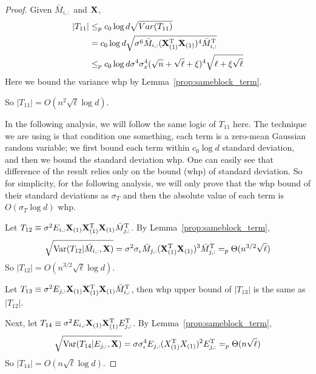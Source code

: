 \begin{proof}
Given $\bar M_{i,:}$ and $\mathbf{X}$, 
\begin{equation}
\begin{split}
    \left|T_{11}\right|  
    &\leq_p c_0 \log d \sqrt{Var(T_{11})}    \\ 
    &= c_0 \log d  \sqrt{\sigma^6 \bar M_{i, :}(\mathbf{X}_{(1)}^{\mathrm{T}}\mathbf{X}_{(1)})^4\bar M^{\mathrm{T}}_{i, :}}    \\ 
    &\leq_p c_0 \log d  \sigma^4 \sigma^4_x (\sqrt n + \sqrt \ell + \xi)^{4}\sqrt{\ell + \xi \sqrt{\ell}} 
\end{split}
\end{equation}
Here we bound the variance whp by Lemma~\ref{prop:sameblock_term}.

So $|T_{11}| = O(n^2\sqrt{\ell}\log d)$.

In the following analysis, we will follow the same logic of $T_{11}$ here. The technique we are using is that condition one something, each term is a zero-mean Gaussian random variable; we first bound each term within $c_0 \log d$ standard deviation, and then we bound the standard deviation whp. One can easily see that difference of the result relies only on the bound (whp) of standard deviation. So for simplicity, for the following analysis, we will only prove that the whp bound of their standard deviations as $\sigma_T$ and then the absolute value of each term is $O(\sigma_T\log d)$ whp.

Let $T_{12} \equiv \sigma^2E_{i,:}\mathbf{X}_{(1)}\mathbf{X}^{\mathrm{T}}_{(1)}\mathbf{X}_{(1)}\bar M^{\mathrm{T}}_{j,:}$. By Lemma~\ref{prop:sameblock_term}, 
\begin{equation}
    \sqrt{\mathrm{Var}(T_{12}|\bar M_{i,:},\mathbf{X})}
    = \sigma^2 \sigma_{\epsilon} \bar M_{j, :}(\mathbf{X}_{(1)}^{\mathrm{T}}\mathbf{X}_{(1)})^3 \bar M^{\mathrm{T}}_{j, :} =_p \Theta(n^{3/2} \sqrt{\ell})
\end{equation}
So $|T_{12}| = O(n^{3/2} \sqrt{\ell}\log d)$.

Let $T_{13} \equiv \sigma^2E_{j,:}\mathbf{X}_{(1)}\mathbf{X}^{\mathrm{T}}_{(1)}\mathbf{X}_{(1)} \bar M^{\mathrm{T}}_{i,:}$, then whp upper bound of $|T_{13}|$ is the same as $|T_{12}|$. 

Next, let $T_{14} \equiv \sigma^2 E_{i,:}\mathbf{X}_{(1)} \mathbf{X}_{(1)}^{\mathrm{T}} E^{\mathrm{T}}_{j,:}$. By Lemma~\ref{prop:sameblock_term}, 
\begin{equation}
    \sqrt{\mathrm{Var}(T_{14}| E_{j,:},\mathbf{X})}
    = \sigma \sigma^4_{\epsilon} E_{j,:}(X^{\mathrm{T}}_{(1)}X_{(1)})^2E^{\mathrm{T}}_{j,:}
    =_p \Theta (n \sqrt{\ell})
\end{equation}
So $|T_{14}| = O(n \sqrt{\ell}\log d)$.


\end{proof}
